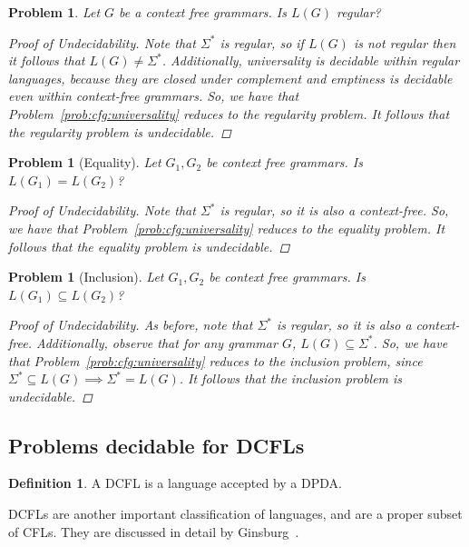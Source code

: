 \documentclass[psamsfonts]{amsart}
\newtheorem{prob}[thm]{Problem}
\theoremstyle{definition}
\newtheorem{defn}[thm]{Definition}
\theoremstyle{remark}
\numberwithin{equation}{section}
\begin{document}
\begin{prob}
  Let $G$ be a context free grammars. Is $L(G)$ regular?
  \begin{proof}[Proof of Undecidability]
    Note that $\Sigma^*$ is regular, so if $L(G)$ is not regular then it follows
    that $L(G)\neq \Sigma^*$. Additionally, universality is decidable within
    regular languages, because they are closed under complement and emptiness is
    decidable even within context-free grammars. So, we have that
    Problem~\ref{prob:cfg:universality} reduces to the regularity problem. It
    follows that the regularity problem is undecidable.
  \end{proof}
\end{prob}
\begin{prob}[Equality]
  Let $G_1,G_2$ be context free grammars. Is $L(G_1)=L(G_2)$?
  \begin{proof}[Proof of Undecidability]
    Note that $\Sigma^*$ is regular, so it is also a context-free. So,
    we have that Problem~\ref{prob:cfg:universality} reduces to the equality
    problem. It follows that the equality problem is undecidable.
  \end{proof}
\end{prob}
\begin{prob}[Inclusion]
  Let $G_1,G_2$ be context free grammars. Is $L(G_1)\subseteq L(G_2)$?
  \begin{proof}[Proof of Undecidability]
    As before, note that $\Sigma^*$ is regular, so it is also a
    context-free. Additionally, observe that for any grammar $G$, $L(G)\subseteq
    \Sigma^*$. So,
    we have that Problem~\ref{prob:cfg:universality} reduces to the inclusion
    problem, since $\Sigma^* \subseteq L(G) \implies \Sigma^* = L(G)$. It follows that the inclusion problem is undecidable.
  \end{proof}
\end{prob}

\subsection{Problems decidable for DCFLs}
\label{sub:dcfl}
\begin{defn}
  A \ac{DCFL} is a language accepted by a
  \acl{DPDA}. 
\end{defn}
\acp{DCFL} are another important classification of languages, and are a proper
subset of \acp{CFL}. They are discussed in detail by Ginsburg~\cite{ginsburg65:_deter}.
\end{document}
